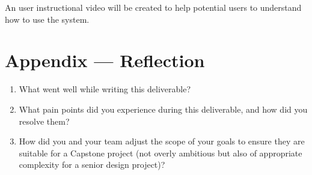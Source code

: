 \documentclass{article}
\begin{document}
An user instructional video will be created to help potential users to
understand how to use the system.

\newpage{}

\section*{Appendix --- Reflection}




\begin{enumerate}
    \item What went well while writing this deliverable?
    \item What pain points did you experience during this deliverable, and how did you
          resolve them?
    \item How did you and your team adjust the scope of your goals to ensure they are
          suitable for a Capstone project (not overly ambitious but also of appropriate
          complexity for a senior design project)?
\end{enumerate}



\end{document}
